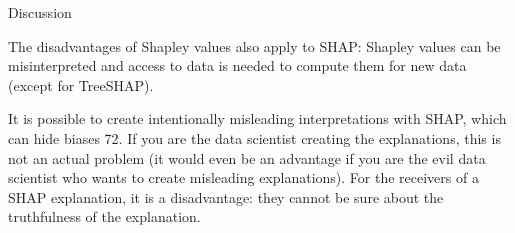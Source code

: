 \documentclass[11pt,compress,t,notes=noshow, aspectratio=169, xcolor=table]{beamer}
\begin{document}
\begin{vbframe}{Discussion}
\begin{onlyenv}
The disadvantages of Shapley values also apply to SHAP: Shapley values can be misinterpreted and access to data is needed to compute them for new data (except for TreeSHAP).

It is possible to create intentionally misleading interpretations with SHAP, which can hide biases 72. If you are the data scientist creating the explanations, this is not an actual problem (it would even be an advantage if you are the evil data scientist who wants to create misleading explanations). For the receivers of a SHAP explanation, it is a disadvantage: they cannot be sure about the truthfulness of the explanation.

\end{onlyenv}

\end{vbframe}

\endlecture
\end{document}
